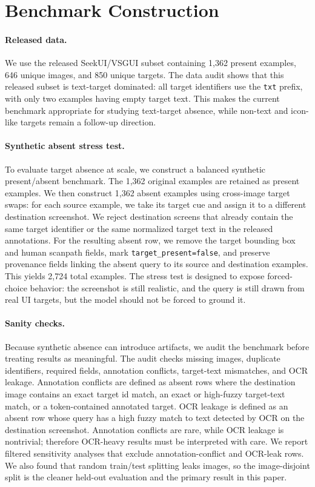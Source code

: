 \section{Benchmark Construction}

\paragraph{Released data.}
We use the released SeekUI/VSGUI subset containing 1,362 present examples, 646 unique images, and 850 unique targets. The data audit shows that this released subset is text-target dominated: all target identifiers use the \texttt{txt} prefix, with only two examples having empty target text. This makes the current benchmark appropriate for studying text-target absence, while non-text and icon-like targets remain a follow-up direction.

\paragraph{Synthetic absent stress test.}
To evaluate target absence at scale, we construct a balanced synthetic present/absent benchmark. The 1,362 original examples are retained as present examples. We then construct 1,362 absent examples using cross-image target swaps: for each source example, we take its target cue and assign it to a different destination screenshot. We reject destination screens that already contain the same target identifier or the same normalized target text in the released annotations. For the resulting absent row, we remove the target bounding box and human scanpath fields, mark \texttt{target\_present=false}, and preserve provenance fields linking the absent query to its source and destination examples. This yields 2,724 total examples. The stress test is designed to expose forced-choice behavior: the screenshot is still realistic, and the query is still drawn from real UI targets, but the model should not be forced to ground it.

\paragraph{Sanity checks.}
Because synthetic absence can introduce artifacts, we audit the benchmark before treating results as meaningful. The audit checks missing images, duplicate identifiers, required fields, annotation conflicts, target-text mismatches, and OCR leakage. Annotation conflicts are defined as absent rows where the destination image contains an exact target id match, an exact or high-fuzzy target-text match, or a token-contained annotated target. OCR leakage is defined as an absent row whose query has a high fuzzy match to text detected by OCR on the destination screenshot. Annotation conflicts are rare, while OCR leakage is nontrivial; therefore OCR-heavy results must be interpreted with care. We report filtered sensitivity analyses that exclude annotation-conflict and OCR-leak rows. We also found that random train/test splitting leaks images, so the image-disjoint split is the cleaner held-out evaluation and the primary result in this paper.

